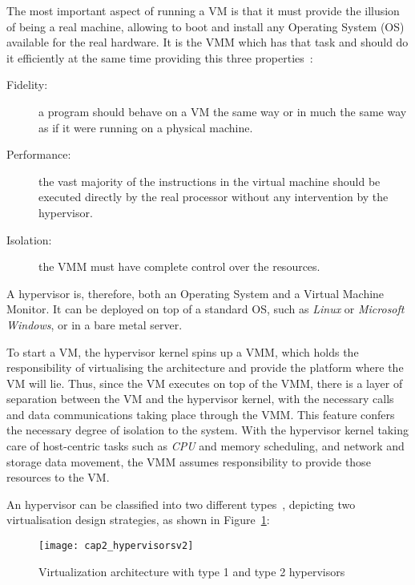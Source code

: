The most important aspect of running a VM is that it must provide the illusion of being a real machine, allowing to boot and install any Operating System (OS) available for the real hardware. It is the VMM which has that task and should do it efficiently at the same time providing this three properties~\cite{Popek1974}:

\begin{description}
	\item[Fidelity:] a program should behave on a VM the same way or in much the same way as if it were running on a physical machine.
	\item[Performance:] the vast majority of the instructions in the virtual machine should be executed directly by the real processor without any intervention by the hypervisor.
	\item[Isolation:] the VMM must have complete control over the resources. 
\end{description}

A hypervisor is, therefore, both an Operating System and a Virtual Machine Monitor. It can be deployed on top of a standard OS, such as \textit{Linux} or \textit{Microsoft Windows}, or in a bare metal server.

To start a VM, the hypervisor kernel spins up a VMM, which holds the responsibility of virtualising the architecture and provide the platform where the VM will lie. Thus, since the VM executes on top of the VMM, there is a layer of separation between the VM and the hypervisor kernel, with the necessary calls and data communications taking place through the VMM. This feature confers the necessary degree of isolation to the system. With the hypervisor  kernel taking care of host-centric tasks such as \textit{CPU} and memory scheduling, and network and storage data movement, the VMM assumes responsibility to provide those resources to the VM.

An hypervisor can be classified into two different types~\cite{Aneja2011}, depicting two virtualisation design strategies, as shown in Figure~\ref{fig:hypervisors}:

\begin{figure}[htbp]
	\centering
	\texttt{[image: cap2\_hypervisorsv2]}
	\caption{Virtualization architecture with type 1 and type 2 hypervisors}
	\label{fig:hypervisors}
\end{figure}

